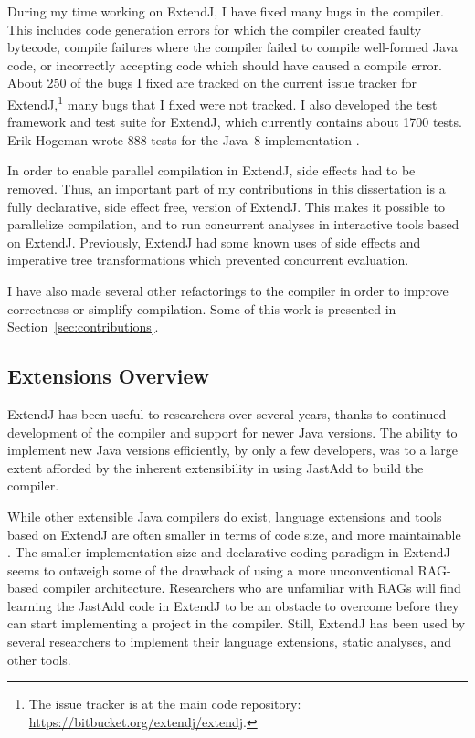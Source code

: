 \documentclass[10pt, twoside, openright]{book}
\newcommand{\secref}[1]{Section~\ref{#1}}
\begin{document}
During my time working on ExtendJ, I have fixed many bugs in the compiler.
This includes code generation errors
for which the compiler
created faulty bytecode, compile failures where the compiler failed to compile well-formed
Java code, or incorrectly accepting code which should have caused a compile error.
About 250 of the bugs I fixed are tracked on the current issue tracker for ExtendJ,\footnote{%
The issue tracker is at the main code repository: \url{https://bitbucket.org/extendj/extendj}.}
many bugs that I fixed were not tracked.
I also developed the test framework and test suite for ExtendJ, which currently
contains about 1700 tests.  Erik Hogeman wrote 888 tests for the Java~8
implementation \cite{Hogeman2014}.

In order to enable parallel compilation in ExtendJ, side effects had to
be removed. Thus, an important part of my
contributions in this dissertation is a fully declarative, side effect free, version
of ExtendJ.  This makes it possible to parallelize
compilation, and to run concurrent analyses in interactive tools based on ExtendJ.
Previously, ExtendJ had some known uses of side effects and imperative tree
transformations which prevented concurrent evaluation.

I have also made several other refactorings to the compiler in order to
improve correctness or simplify compilation.
Some of this work is presented in \secref{sec:contributions}.



\subsection{Extensions Overview}

ExtendJ has been useful to researchers over several years, thanks to continued development
of the compiler and support for newer Java versions.
The ability to implement new Java versions efficiently,
by only a few developers, was to a large extent afforded by the inherent extensibility
in using JastAdd to build the compiler.

While other extensible Java compilers do exist, language extensions and tools based on ExtendJ are
often smaller in terms of code size, and more maintainable \cite{DBLP:conf/aosd/AvgustinovET08}.
The smaller implementation size and declarative coding paradigm in ExtendJ
seems to outweigh some of the drawback of using a more unconventional RAG-based
compiler architecture. Researchers who are unfamiliar with RAGs will find
learning
the JastAdd code in ExtendJ to be an obstacle to overcome before they can start implementing
a project in the compiler. Still, ExtendJ has been used by several researchers to
implement their language extensions, static analyses, and other tools.
\end{document}
